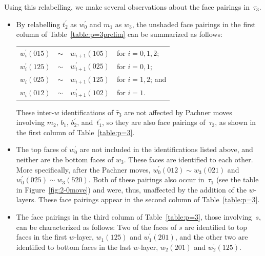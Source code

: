 \documentclass[reqno]{amsart}
\theoremstyle{plain}
\theoremstyle{definition}
\begin{document}
Using this relabelling, we make several observations about the face pairings in~$\tau_{3}$.

\begin{itemize}

\item
By relabelling $t_2^\prime$ as $w_0^\prime$ and $m_1$ as $w_3$, the unshaded face pairings in the first column of Table~\ref{table:p=3prelim} can be summarized as follows:
\begin{center}
\begin{tabular}{ l c l l  }

$w_i^\prime(015)$    &$\sim$	&$w_{i+1}(105)$	&for $i=0,1,2$;\\

 $w_i^\prime(125)$    &$\sim$	&$w_{i+1}^\prime(025)$	&for $i=0,1$;\\

$w_i(025)$    &$\sim$	&$w_{i+1}(125)$	&for $i=1,2$; and\\

$w_i(012)$    &$\sim$	&$w_{i+1}^\prime(102)$	&for $i=1$.\\



 \end{tabular}
\end{center}
These inter-$w$ identifications of $\hat{\tau}_3$ are not affected by Pachner moves involving $m_2$, $b_1$, $b_2^\prime$, and~$t_1^\prime$, so they are also face pairings of~$\tau_{3}$, as shown in the first column of Table~\ref{table:p=3}.

\item
The top faces of $w_0^\prime$ are not included in the identifications listed above, and neither are the bottom faces of $w_3$.  These faces are identified to each other.  More specifically, after the Pachner moves, $w_0^\prime(012)\sim w_3(021)$ and $w_0^\prime(025)\sim w_3(520)$.  Both of these pairings also occur in~$\tau_{1}$ (see the table in Figure~\ref{fig:2-0move}) and were, thus, unaffected by the addition of the $w$-layers.  These face pairings appear in the second column of Table~\ref{table:p=3}.


\item
The face pairings in the third column of Table~\ref{table:p=3}, those involving~$s$, can be characterized as follows:  Two of the faces of $s$ are identified to top faces in the first $w$-layer, $w_1(125)$ and $w_1^\prime(201)$, and the other two are identified to bottom faces in the last $w$-layer, $w_2(201)$ and $w_2^\prime(125)$.
\end{itemize}
\end{document}
